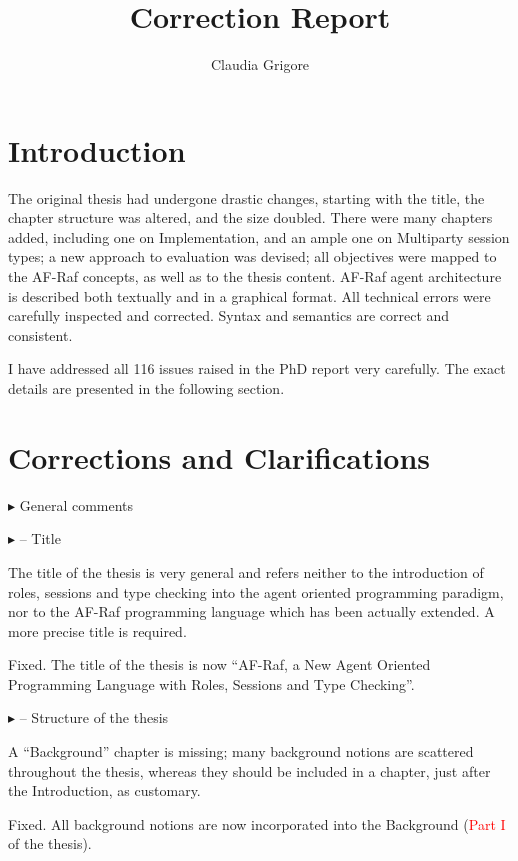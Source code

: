 \documentclass{article}
\title{Correction Report}
\author{Claudia Grigore}
\newcommand*\R[1]{\textcolor{red}{#1}} %
\newenvironment{them}%
  {\bigskip\noindent\begingroup\color{blue}$\blacktriangleright$\enspace}%
  {\endgroup\par}
\begin{document}
\maketitle

\section{Introduction}
The original thesis had undergone drastic changes, starting with the title, the chapter structure was altered, and the size doubled. There were many chapters added, including one on Implementation, and an ample one on Multiparty session types; a new approach to evaluation was devised; all objectives were mapped to the AF-Raf concepts, as well as to the thesis content. AF-Raf agent architecture is described both textually and in a graphical format. All technical errors were carefully inspected and corrected. Syntax and semantics are correct and consistent.

I have addressed all 116 issues raised in the PhD report very carefully. The
exact details are presented in the following section.

\section{Corrections and Clarifications}

\begin{them}
General comments
\end{them}


\begin{them}
-- Title

The title of the thesis is very general and refers neither to the introduction
of roles, sessions and type checking into the agent oriented programming
paradigm, nor to the AF-Raf programming language which has been actually
extended. A more precise title is required.
\end{them}
Fixed. The title of the thesis is now ``AF-Raf, a New Agent Oriented Programming
Language with Roles, Sessions and Type Checking''.

\begin{them}
-- Structure of the thesis

A ``Background'' chapter is missing; many background notions are scattered
throughout the thesis, whereas they should be included in a chapter, just after
the Introduction, as customary.
\end{them}
Fixed. All background notions are now incorporated into the Background (\R{Part
I} of the thesis).
\end{document}

